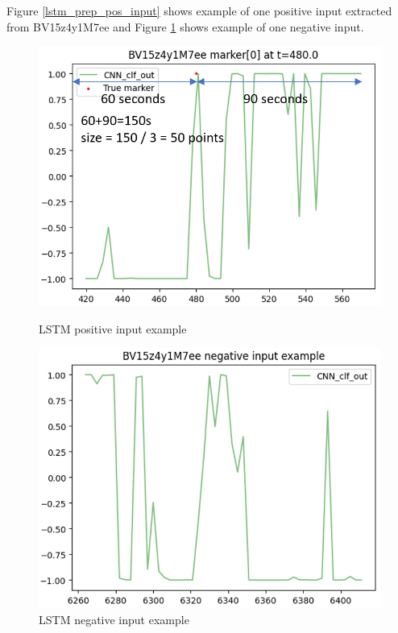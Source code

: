\documentclass{article}
\begin{document}
    Figure \ref{lstm_prep_pos_input} shows example of one positive input extracted from BV15z4y1M7ee and Figure \ref{lstm_prep_neg_input} shows example of one negative input.  
    \begin{figure}[H]
        \begin{minipage}{0.49\linewidth}
            \includegraphics[width=\linewidth]{figures/lstm_prep_pos_input.png}
            \caption{LSTM positive input example}
            \label{lstm_prep_pos_input}
        \end{minipage}
        \begin{minipage}{0.49\linewidth}
            \includegraphics[width=\linewidth]{figures/lstm_prep_neg_input.png}
            \caption{LSTM negative input example}
            \label{lstm_prep_neg_input}
        \end{minipage}
    \end{figure}
\end{document}
